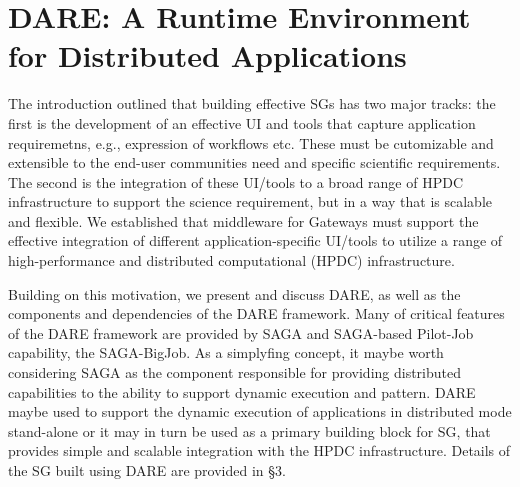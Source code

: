 \documentclass[]{svjour3}
\begin{document}




\section{DARE: A Runtime Environment for Distributed Applications}

The introduction outlined that building effective SGs has two major
tracks: the first is the development of an effective UI and tools that
capture application requiremetns, e.g., expression of workflows etc.
These must be cutomizable and extensible to the end-user communities
need and specific scientific requirements. The second is the
integration of these UI/tools to a broad range of HPDC infrastructure
to support the science requirement, but in a way that is scalable and
flexible. We established that middleware for Gateways must support the
effective integration of different application-specific UI/tools to
utilize a range of high-performance and distributed computational
(HPDC) infrastructure.

Building on this motivation, we present and discuss DARE, as well as
the components and dependencies of the DARE framework.  Many of
critical features of the DARE framework are provided by SAGA and
SAGA-based Pilot-Job capability, the SAGA-BigJob\cite{saga-ccgrid10}.
As a simplyfing concept, it maybe worth considering SAGA as the
component responsible for providing distributed capabilities to the
ability to support dynamic execution and pattern.  DARE maybe used to
support the dynamic execution of applications in distributed mode
stand-alone or it may in turn be used as a primary building block for
SG, that provides simple and scalable integration with the HPDC
infrastructure.  Details of the SG built using DARE are provided in
\S3.
\end{document}
